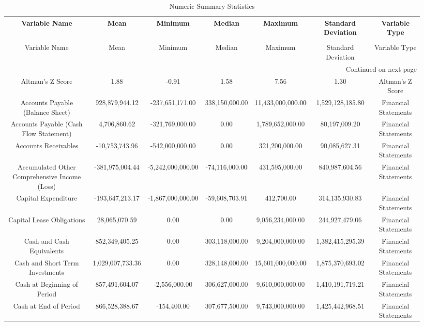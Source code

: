 \small
\begin{longtable}{ccccccc}
\caption{Numeric Summary Statistics} \label{tab:numeric_summary_statistics} \\
\toprule
Variable Name & Mean & Minimum & Median & Maximum & Standard Deviation & Variable Type \\
\midrule
\endfirsthead
\caption[]{Numeric Summary Statistics} \\
\toprule
Variable Name & Mean & Minimum & Median & Maximum & Standard Deviation & Variable Type \\
\midrule
\endhead
\midrule
\multicolumn{7}{r}{Continued on next page} \\
\midrule
\endfoot
\bottomrule
\endlastfoot
Altman's Z Score & 1.88 & -0.91 & 1.58 & 7.56 & 1.30 & Altman's Z Score \\
Accounts Payable (Balance Sheet) & 928,879,944.12 & -237,651,171.00 & 338,150,000.00 & 11,433,000,000.00 & 1,529,128,185.80 & Financial Statements \\
Accounts Payable (Cash Flow Statement) & 4,706,860.62 & -321,769,000.00 & 0.00 & 1,789,652,000.00 & 80,197,009.20 & Financial Statements \\
Accounts Receivables & -10,753,743.96 & -542,000,000.00 & 0.00 & 321,200,000.00 & 90,085,627.31 & Financial Statements \\
Accumulated Other Comprehensive Income (Loss) & -381,975,004.44 & -5,242,000,000.00 & -74,116,000.00 & 431,595,000.00 & 840,987,604.56 & Financial Statements \\
Capital Expenditure & -193,647,213.17 & -1,867,000,000.00 & -59,608,703.91 & 412,700.00 & 314,135,930.83 & Financial Statements \\
Capital Lease Obligations & 28,065,070.59 & 0.00 & 0.00 & 9,056,234,000.00 & 244,927,479.06 & Financial Statements \\
Cash and Cash Equivalents & 852,349,405.25 & 0.00 & 303,118,000.00 & 9,204,000,000.00 & 1,382,415,295.39 & Financial Statements \\
Cash and Short Term Investments & 1,029,007,733.36 & 0.00 & 328,148,000.00 & 15,601,000,000.00 & 1,875,370,693.02 & Financial Statements \\
Cash at Beginning of Period & 857,491,604.07 & -2,556,000.00 & 306,627,000.00 & 9,610,000,000.00 & 1,410,191,719.21 & Financial Statements \\
Cash at End of Period & 866,528,388.67 & -154,400.00 & 307,677,500.00 & 9,743,000,000.00 & 1,425,442,968.51 & Financial Statements \\

\end{longtable}
